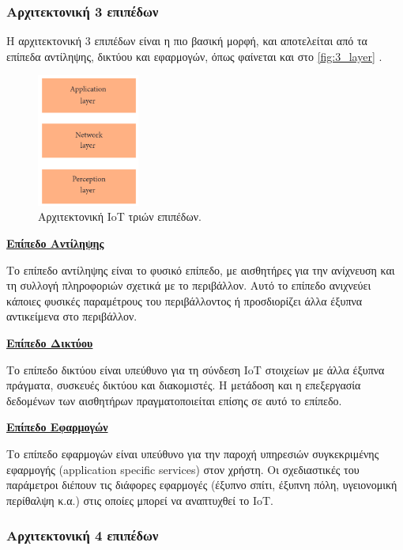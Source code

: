 \subsubsection{Αρχιτεκτονική 3 επιπέδων}
\label{subsubsec:3_layer}

Η αρχιτεκτονική 3 επιπέδων είναι η πιο βασική μορφή, και αποτελείται από τα επίπεδα αντίληψης, δικτύου και εφαρμογών, όπως φαίνεται και στο \autoref{fig:3_layer} \cite{bib:sethi_2017}.

\begin{figure}[!ht]
	\centering
	\includegraphics[width=0.3\textwidth]{./images/chapter3/3_layer.png}
	\caption{Αρχιτεκτονική IoT τριών επιπέδων.}
	\label{fig:3_layer}
\end{figure}

\textbf{\underline{Επίπεδο Αντίληψης}}

Το επίπεδο αντίληψης είναι το φυσικό επίπεδο, με αισθητήρες για την ανίχνευση και τη συλλογή πληροφοριών σχετικά με το περιβάλλον. Αυτό το επίπεδο ανιχνεύει κάποιες φυσικές παραμέτρους του περιβάλλοντος ή προσδιορίζει άλλα έξυπνα αντικείμενα στο περιβάλλον.

\textbf{\underline{Επίπεδο Δικτύου}}

Το επίπεδο δικτύου είναι υπεύθυνο για τη σύνδεση IoT στοιχείων με άλλα έξυπνα πράγματα, συσκευές δικτύου και διακομιστές. Η μετάδοση και η επεξεργασία δεδομένων των αισθητήρων πραγματοποιείται επίσης σε αυτό το επίπεδο.

\textbf{\underline{Επίπεδο Εφαρμογών}}

Το επίπεδο εφαρμογών είναι υπεύθυνο για την παροχή υπηρεσιών συγκεκριμένης εφαρμογής (application specific services) στον χρήστη. Οι σχεδιαστικές του παράμετροι διέπουν τις διάφορες εφαρμογές (έξυπνο σπίτι, έξυπνη πόλη, υγειονομική περίθαλψη κ.α.) στις οποίες μπορεί να αναπτυχθεί το IoT.

\subsubsection{Αρχιτεκτονική 4 επιπέδων}
\label{subsubsec:4_layer}


